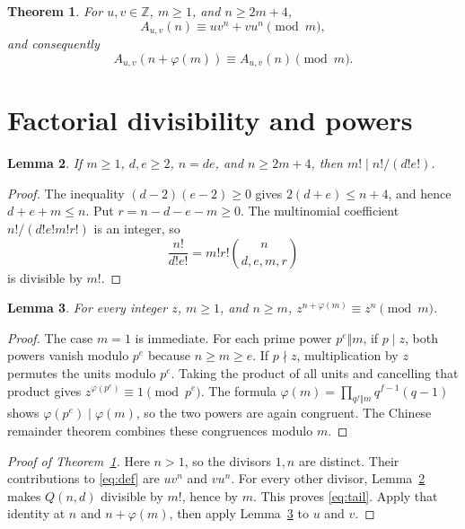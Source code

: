 \documentclass[11pt]{article}
\newtheorem{theorem}{Theorem}
\newtheorem{lemma}[theorem]{Lemma}
\newcommand{\A}{A_{u,v}}
\begin{document}
\begin{theorem}\label{thm:main}
For $u,v\in\mathbb Z$, $m\geq1$, and $n\geq2m+4$,
\begin{equation}\label{eq:tail}
 \A(n)\equiv uv^n+vu^n\pmod m,
\end{equation}
and consequently
\begin{equation}\label{eq:period}
 \A(n+\varphi(m))\equiv\A(n)\pmod m.
\end{equation}
\end{theorem}

\section{Factorial divisibility and powers}
\begin{lemma}\label{lem:factorial}
If $m\geq1$, $d,e\geq2$, $n=de$, and $n\geq2m+4$, then
$m!\mid n!/(d!e!)$.
\end{lemma}
\begin{proof}
The inequality $(d-2)(e-2)\geq0$ gives
$2(d+e)\leq n+4$, and hence $d+e+m\leq n$.
Put $r=n-d-e-m\geq0$. The multinomial coefficient
$n!/(d!e!m!r!)$ is an integer, so
\[
 \frac{n!}{d!e!}=m!r!\binom{n}{d,e,m,r}
\]
is divisible by $m!$.
\end{proof}

\begin{lemma}\label{lem:powers}
For every integer $z$, $m\geq1$, and $n\geq m$,
$z^{n+\varphi(m)}\equiv z^n\pmod m$.
\end{lemma}
\begin{proof}
The case $m=1$ is immediate. For each prime power $p^e\Vert m$,
if $p\mid z$, both powers vanish modulo $p^e$ because $n\geq m\geq e$.
If $p\nmid z$, multiplication by $z$ permutes the units modulo $p^e$.
Taking the product of all units and cancelling that product gives
$z^{\varphi(p^e)}\equiv1\pmod{p^e}$.
The formula $\varphi(m)=\prod_{q^f\Vert m}q^{f-1}(q-1)$ shows
$\varphi(p^e)\mid\varphi(m)$, so the two powers are again congruent.
The Chinese remainder theorem combines these congruences modulo $m$.
\end{proof}

\begin{proof}[Proof of Theorem~\ref{thm:main}]
Here $n>1$, so the divisors $1,n$ are distinct. Their contributions
to \eqref{eq:def} are $uv^n$ and $vu^n$. For every other divisor,
Lemma~\ref{lem:factorial} makes $Q(n,d)$ divisible by $m!$, hence by $m$.
This proves \eqref{eq:tail}. Apply that identity at $n$ and
$n+\varphi(m)$, then apply Lemma~\ref{lem:powers} to $u$ and $v$.
\end{proof}
\end{document}
